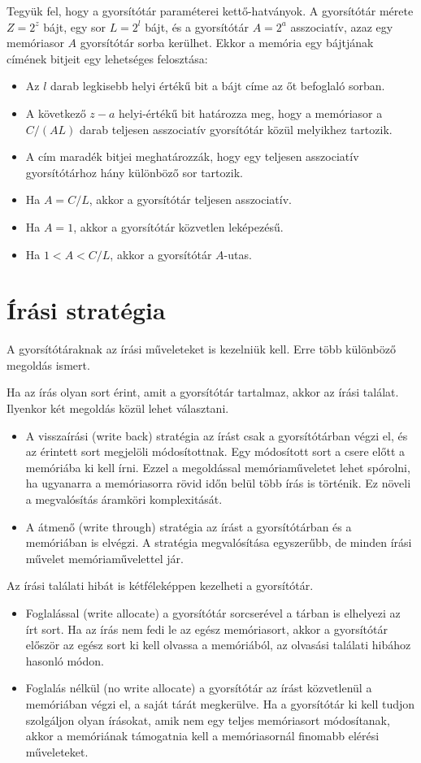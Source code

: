 \documentclass[12pt]{report}
\begin{document}
Tegyük fel, hogy a gyorsítótár paraméterei kettő-hatványok.
A gyorsítótár mérete $Z=2^z$ bájt, egy sor $L=2^l$ bájt,
és a gyorsítótár $A=2^a$ asszociatív,
azaz egy memóriasor $A$ gyorsítótár sorba kerülhet.
Ekkor a memória egy bájtjának címének bitjeit egy lehetséges felosztása:
\begin{itemize}
\item Az $l$ darab legkisebb helyi értékű bit a bájt címe az őt befoglaló sorban.
\item A következő $z-a$ helyi-értékű bit határozza meg,
hogy a memóriasor a $C/(AL)$ darab
teljesen asszociatív gyorsítótár közül melyikhez tartozik.
\item A cím maradék bitjei meghatározzák,
hogy egy teljesen asszociatív gyorsítótárhoz hány különböző sor tartozik.
\item Ha $A=C/L$, akkor a gyorsítótár teljesen asszociatív.
\item Ha $A=1$, akkor a gyorsítótár közvetlen leképezésű.
\item Ha $1<A<C/L$, akkor a gyorsítótár $A$-utas.
\end{itemize}

\section{Írási stratégia}

A gyorsítótáraknak az írási műveleteket is kezelniük kell.
Erre több különböző megoldás ismert\cite{computer-architecture}.

Ha az írás olyan sort érint, amit a gyorsítótár tartalmaz,
akkor az írási találat. Ilyenkor két megoldás közül lehet választani.
\begin{itemize}
\item A visszaírási (write back) stratégia az írást csak a gyorsítótárban végzi el,
és az érintett sort megjelöli módosítottnak.
Egy módosított sort a csere előtt a memóriába ki kell írni.
Ezzel a megoldással memóriaműveletet lehet spórolni,
ha ugyanarra a memóriasorra rövid időn belül több írás is történik.
Ez növeli a megvalósítás áramköri komplexitását.
\item A átmenő (write through) stratégia az írást a gyorsítótárban és a memóriában is elvégzi.
A stratégia megvalósítása egyszerűbb, de minden írási művelet
memóriaművelettel jár.
\end{itemize}

Az írási találati hibát is kétféleképpen kezelheti a gyorsítótár.
\begin{itemize}
\item Foglalással (write allocate) a gyorsítótár sorcserével
a tárban is elhelyezi az írt sort.
Ha az írás nem fedi le az egész memóriasort, akkor a gyorsítótár
először az egész sort ki kell olvassa a memóriából,
az olvasási találati hibához hasonló módon.
\item Foglalás nélkül (no write allocate) a gyorsítótár az írást
közvetlenül a memóriában végzi el, a saját tárát megkerülve.
Ha a gyorsítótár ki kell tudjon szolgáljon olyan írásokat,
amik nem egy teljes memóriasort módosítanak,
akkor a memóriának támogatnia kell a memóriasornál finomabb elérési műveleteket.
\end{itemize}
\end{document}
